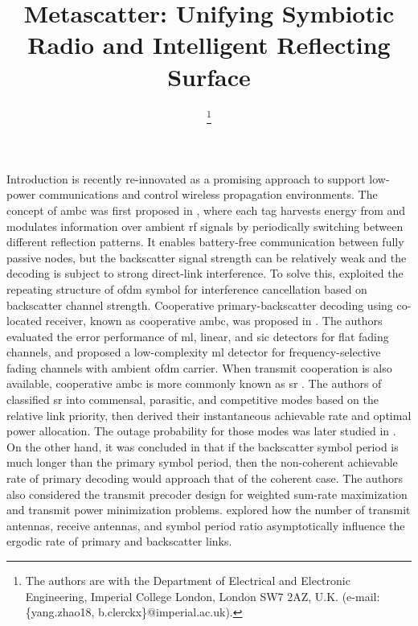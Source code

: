 \documentclass[journal]{IEEEtran}
\begin{document}
\title{Metascatter: Unifying Symbiotic Radio and Intelligent Reflecting Surface}
\author{
	\thanks{
		The authors are with the Department of Electrical and Electronic Engineering, Imperial College London, London SW7 2AZ, U.K. (e-mail: \{yang.zhao18, b.clerckx\}@imperial.ac.uk).
	}
}
\maketitle

\begin{section}{Introduction}
	 is recently re-innovated as a promising approach to support low-power communications and control wireless propagation environments.
	The concept of \gls{ambc} was first proposed in \cite{Liu2013b}, where each tag harvests energy from and modulates information over ambient \gls{rf} signals by periodically switching between different reflection patterns.
	It enables battery-free communication between fully passive nodes, but the backscatter signal strength can be relatively weak and the decoding is subject to strong direct-link interference.
	To solve this, \cite{Yang2018d} exploited the repeating structure of \gls{ofdm} symbol for interference cancellation based on backscatter channel strength.
	Cooperative primary-backscatter decoding using co-located receiver, known as cooperative \gls{ambc}, was proposed in \cite{Yang2018}.
	The authors evaluated the error performance of \gls{ml}, linear, and \gls{sic} detectors for flat fading channels, and proposed a low-complexity \gls{ml} detector for frequency-selective fading channels with ambient \gls{ofdm} carrier.
	When transmit cooperation is also available, cooperative \gls{ambc} is more commonly known as \gls{sr} \cite{Liang2020}.
	The authors of \cite{Guo2019b} classified \gls{sr} into commensal, parasitic, and competitive modes based on the relative link priority, then derived their instantaneous achievable rate and optimal power allocation.
	The outage probability for those modes was later studied in \cite{Ding2020}.
	On the other hand, it was concluded in \cite{Long2020a} that if the backscatter symbol period is much longer than the primary symbol period, then the non-coherent achievable rate of primary decoding would approach that of the coherent case.
	The authors also considered the transmit precoder design for weighted sum-rate maximization and transmit power minimization problems.
	\cite{Zhou2019a} explored how the number of transmit antennas, receive antennas, and symbol period ratio asymptotically influence the ergodic rate of primary and backscatter links.

\end{section}
\end{document}

